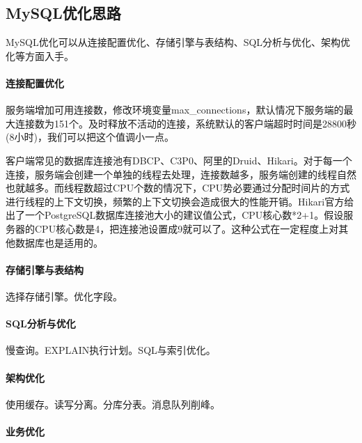 \documentclass[../../../interview-questions.tex]{subfiles}
\begin{document}
\subsection{MySQL优化思路}

MySQL优化可以从连接配置优化、存储引擎与表结构、SQL分析与优化、架构优化等方面入手。

\paragraph{连接配置优化}

服务端增加可用连接数，修改环境变量max\_connections，默认情况下服务端的最大连接数为151个。及时释放不活动的连接，系统默认的客户端超时时间是28800秒(8小时)，我们可以把这个值调小一点。

客户端常见的数据库连接池有DBCP、C3P0、阿里的Druid、Hikari。对于每一个连接，服务端会创建一个单独的线程去处理，连接数越多，服务端创建的线程自然也就越多。而线程数超过CPU个数的情况下，CPU势必要通过分配时间片的方式进行线程的上下文切换，频繁的上下文切换会造成很大的性能开销。Hikari官方给出了一个PostgreSQL数据库连接池大小的建议值公式，CPU核心数*2+1。假设服务器的CPU核心数是4，把连接池设置成9就可以了。这种公式在一定程度上对其他数据库也是适用的。

\paragraph{存储引擎与表结构}

选择存储引擎。优化字段。

\paragraph{SQL分析与优化}

慢查询。EXPLAIN执行计划。SQL与索引优化。

\paragraph{架构优化}

使用缓存。读写分离。分库分表。消息队列削峰。

\paragraph{业务优化}
\end{document}
